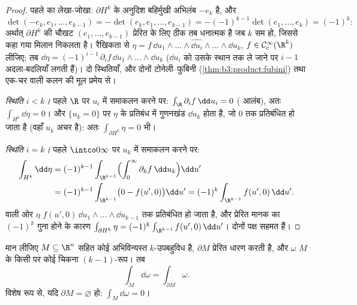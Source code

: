 \begin{proof}
पहले  का लेखा-जोखा: $\partial H^k$ के अनुदिश बहिर्मुखी अभिलंब
$-e_k$ है, और
\[
\det(-e_k, e_1, \dots, e_{k-1}) =
-\det(e_k, e_1, \dots, e_{k-1}) = -(-1)^{k-1}\det(e_1,
\dots, e_k) = (-1)^k :
\]
अर्थात् $\partial H^k$ की चौखट $(e_1, \dots, e_{k-1})$ प्रेरित  के लिए ठीक तब
धनात्मक है जब $k$ सम हो, जिससे कहा गया मिलान निकलता है।
रैखिकता से $\eta
= f\,\dd u_1\wedge\dots\wedge\widehat{\dd
u_i}\wedge\dots\wedge\dd u_k$, $f \in \mathcal
C^\infty_c(\R^k)$ लीजिए; तब $\dd\eta =
(-1)^{i-1}\,\partial_if\,\dd u_1\wedge\dots\wedge\dd u_k$ ($\dd u_i$ को उसके स्थान तक
ले जाने पर $i - 1$ अदला-बदलियाँ लगती हैं)। दो स्थितियाँ, और दोनों
टोनेली--फुबिनी (\cref{thm:b3:product:fubini}) तथा एक-चर वाली कलन की मूल प्रमेय से।

\emph{स्थिति $i < k$।} पहले $\R$ पर $u_i$ में समाकलन करने पर:
$\int_\R\partial_if\,\dd u_i = 0$ ( आलंब), अतः $\int_{H^k}\dd\eta = 0$। और $\{u_k = 0\}$ पर $\eta$ के प्रतिबंध में
गुणनखंड $\dd u_k$ होता है, जो $0$ तक प्रतिबंधित हो जाता है (वहाँ
$u_k$ अचर है): अतः $\int_{\partial H^k}\eta =
0$ भी।

\emph{स्थिति $i = k$।} पहले $\intco0\infty$ पर $u_k$ में समाकलन करने पर:
\begin{align*}
\int_{H^k}\dd\eta &= (-1)^{k-1}\int_{\R^{k-1}}
\Bigl(\int_0^\infty\partial_kf\,\dd u_k\Bigr)\dd u' \\
&= (-1)^{k-1}\int_{\R^{k-1}}\bigl(0 - f(u', 0)\bigr)\dd u'
= (-1)^k\int_{\R^{k-1}}f(u',0)\,\dd u' .
\end{align*}
 वाली ओर $\eta$ $f(u',
0)\,\dd u_1\wedge\dots\wedge\dd u_{k-1}$ तक प्रतिबंधित हो जाता है, और प्रेरित
 मानक  का $(-1)^k$ गुना होने के कारण $\int_{\partial H^k}\eta =
(-1)^k\int_{\R^{k-1}}f(u',0)\,\dd u'$।
दोनों पक्ष सहमत हैं।
\end{proof}

\begin{theorem}[स्टोक्स]\label{thm:b3:forms:stokes}
मान लीजिए $M \subseteq \R^n$  सहित कोई  अभिविन्यस्त
$k$-उपबहुविध है, $\partial M$ प्रेरित  धारण करती है, और
$\omega$ $M$ के किसी  पर कोई चिकना $(k-1)$-रूप। तब
\[
\int_M\dd\omega = \int_{\partial M}\omega .
\]
विशेष रूप से, यदि $\partial M = \varnothing$ हो: $\int_M\dd\omega = 0$।
\end{theorem}

